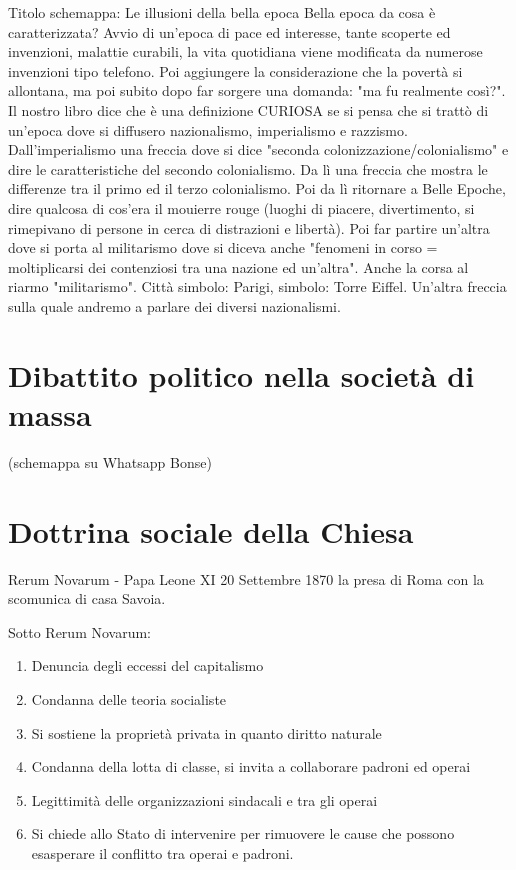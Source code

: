 \documentclass{article}
\begin{document}
    Titolo schemappa: Le illusioni della bella epoca
    Bella epoca da cosa è caratterizzata? Avvio di un'epoca di pace ed interesse, tante scoperte ed invenzioni, malattie curabili, la vita quotidiana viene modificata da numerose invenzioni tipo telefono.
    Poi aggiungere la considerazione che la povertà si allontana, ma poi subito dopo far sorgere una domanda: "ma fu realmente così?". Il nostro libro dice che è una definizione CURIOSA se si pensa che si trattò di un'epoca dove si diffusero nazionalismo, imperialismo e razzismo. Dall'imperialismo una freccia dove si dice "seconda colonizzazione/colonialismo" e dire le caratteristiche del secondo colonialismo. Da lì una freccia che mostra le differenze tra il primo ed il terzo colonialismo.
    Poi da lì ritornare a Belle Epoche, dire qualcosa di cos'era il mouierre rouge (luoghi di piacere, divertimento, si rimepivano di persone in cerca di distrazioni e libertà). Poi far partire un'altra dove si porta al militarismo dove si diceva anche "fenomeni in corso = moltiplicarsi dei contenziosi tra una nazione ed un'altra". Anche la corsa al riarmo "militarismo".
    Città simbolo: Parigi, simbolo: Torre Eiffel.
    Un'altra freccia sulla quale andremo a parlare dei diversi nazionalismi.

    \section{Dibattito politico nella società di massa}
    (schemappa su Whatsapp Bonse)

    \section{Dottrina sociale della Chiesa}

    Rerum Novarum - Papa Leone XI 20 Settembre 1870 la presa di Roma con la scomunica di casa Savoia.
    
    Sotto Rerum Novarum:
    \begin{enumerate}
        \item Denuncia degli eccessi del capitalismo
        \item Condanna delle teoria socialiste
        \item Si sostiene la proprietà privata in quanto diritto naturale
        \item Condanna della lotta di classe, si invita a collaborare padroni ed operai
        \item Legittimità delle organizzazioni sindacali e tra gli operai
        \item Si chiede allo Stato di intervenire per rimuovere le cause che possono esasperare il conflitto tra operai e padroni.
    \end{enumerate}
\end{document}
